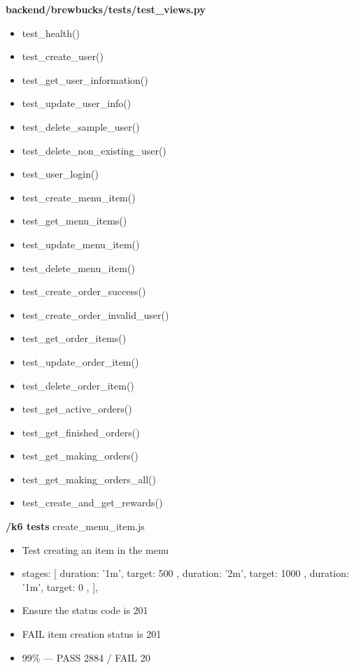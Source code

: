 \documentclass{article}
\begin{document}
\medskip \noindent \textbf{backend/brewbucks/tests/test\_views.py}
\begin{itemize}
    \item test\_health()
    \item test\_create\_user()
    \item test\_get\_user\_information()
    \item test\_update\_user\_info()
    \item test\_delete\_sample\_user()
    \item test\_delete\_non\_existing\_user()
    \item test\_user\_login()
    \item test\_create\_menu\_item()
    \item test\_get\_menu\_items()
    \item test\_update\_menu\_item()
    \item test\_delete\_menu\_item()
    \item test\_create\_order\_success()
    \item test\_create\_order\_invalid\_user()
    \item test\_get\_order\_items()
    \item test\_update\_order\_item()
    \item test\_delete\_order\_item()
    \item test\_get\_active\_orders()
    \item test\_get\_finished\_orders()
    \item test\_get\_making\_orders()
    \item test\_get\_making\_orders\_all()
    \item test\_create\_and\_get\_rewards()
\end{itemize}

\medskip \noindent \textbf{/k6 tests}
create\_menu\_item.js
\begin{itemize}
    \item Test creating an item in the menu 
    \item stages: [
        { duration: '1m', target: 500 },
        { duration: '2m', target: 1000 },
        { duration: '1m', target: 0 },
    ],
    \item Ensure the status code is 201
    \item FAIL item creation status is 201
    \item 99\% — PASS 2884 / FAIL 20
\end{itemize}
\end{document}
